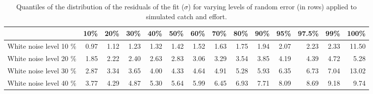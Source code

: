 \begin{sidewaystable}[ht]
\centering
\begin{tabular}{rrrrrrrrrrrrrr}
  \hline
 & 10\% & 20\% & 30\% & 40\% & 50\% & 60\% & 70\% & 80\% & 90\% & 95\% & 97.5\% & 99\% & 100\% \\ 
  \hline
White noise level  10 \% & 0.97 & 1.12 & 1.23 & 1.32 & 1.42 & 1.52 & 1.63 & 1.75 & 1.94 & 2.07 & 2.23 & 2.33 & 11.50 \\ 
  White noise level  20 \% & 1.85 & 2.22 & 2.40 & 2.63 & 2.83 & 3.06 & 3.29 & 3.54 & 3.85 & 4.19 & 4.39 & 4.72 & 5.28 \\ 
  White noise level  30 \% & 2.87 & 3.34 & 3.65 & 4.00 & 4.33 & 4.64 & 4.91 & 5.28 & 5.93 & 6.35 & 6.73 & 7.04 & 13.02 \\ 
  White noise level  40 \% & 3.77 & 4.29 & 4.87 & 5.30 & 5.64 & 5.99 & 6.45 & 6.93 & 7.71 & 8.09 & 8.69 & 9.18 & 9.74 \\ 
   \hline
\end{tabular}
\caption{Quantiles of the distribution of the residuals of the fit ($\sigma$) for varying levels of random error (in rows) applied to simulated catch and effort.} 
\label{tab:SummaryOfDistributionOfSigma}
\end{sidewaystable}
